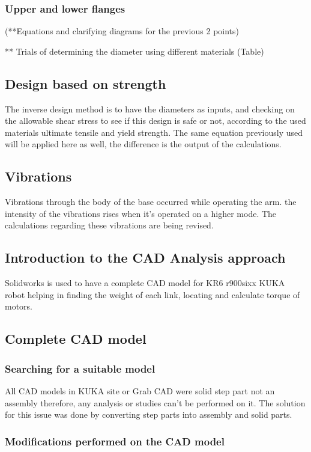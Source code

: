 \documentclass{book}
\begin{document}
				\subsubsection{Upper and lower flanges}
				(**Equations and clarifying diagrams for the previous 2 points)
				
				** Trials of determining the diameter using different materials (Table)
				
			
			\newpage
			\subsection{Design based on strength}
			The inverse design method is to have the diameters as inputs, and checking on the allowable shear stress to see if this design is safe or not, according to the used materials ultimate tensile and yield strength.
			The same equation previously used will be applied here as well, the difference is  the output of the calculations.
			
			\newpage
			\subsection{Vibrations}
			Vibrations through the body of the base occurred while operating the arm. the intensity of the vibrations rises when it’s operated on a higher mode.
			The calculations regarding these vibrations are being revised.
			
			
			\newpage
			\subsection{Introduction to the CAD Analysis approach}
				Solidworks is used to have a complete CAD model for KR6 r900sixx KUKA robot helping in finding the weight of each link, locating and calculate torque of motors. 
				
			\subsection{Complete CAD model}
				\subsubsection{Searching for a suitable model}			
				All CAD models in KUKA site or Grab CAD were solid step part not an assembly therefore, any analysis or studies can’t be performed on it. The solution for this issue was done by converting step parts into assembly and solid parts.
				\subsubsection{Modifications performed on the CAD model}
\end{document}
